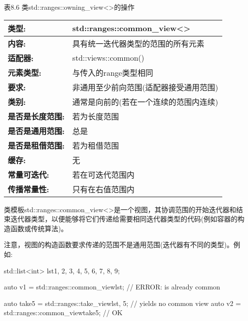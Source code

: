 \begin{center}
表8.6 类std::ranges::owning\_view<>的操作
\end{center}


\begin{longtable}[c]{|l|l|}
\hline
\textbf{类型:}     & std::ranges::common\_view\textless{}\textgreater{}                \\ \hline
\endfirsthead
%
\endhead
%
\textbf{内容:}  & 具有统一迭代器类型的范围的所有元素            \\ \hline
\textbf{适配器:}              & std::views::common()        \\ \hline
\textbf{元素类型:}         & 与传入的range类型相同 \\ \hline
\textbf{要求:} & 非通用至少前向范围(适配器接受通用范围) \\ \hline
\textbf{类别:} & 通常是向前的(若在一个连续的范围内连续)        \\ \hline
\textbf{是否是长度范围:}       & 若为长度范围           \\ \hline
\textbf{是否是通用范围:}      & 总是                      \\ \hline
\textbf{是否是租借范围:}   & 若为租借范围      \\ \hline
\textbf{缓存:}               & 无                     \\ \hline
\textbf{常量可迭代:}       & 若在可迭代范围内  \\ \hline
\textbf{传播常量性:} & 只有在右值范围内     \\ \hline
\end{longtable}

类模板std::ranges::common\_view<>是一个视图，其协调范围的开始迭代器和结束迭代器类型，以便能够将它们传递给需要相同迭代器类型的代码(例如容器的构造函数或传统算法)。

注意，视图的构造函数要求传递的范围不是通用范围(迭代器有不同的类型)。例如:

\begin{cpp}
std::list<int> lst{1, 2, 3, 4, 5, 6, 7, 8, 9};

auto v1 = std::ranges::common_view{lst}; // ERROR: is already common

auto take5 = std::ranges::take_view{lst, 5}; // yields no common view
auto v2 = std::ranges::common_view{take5}; // OK
\end{cpp}

